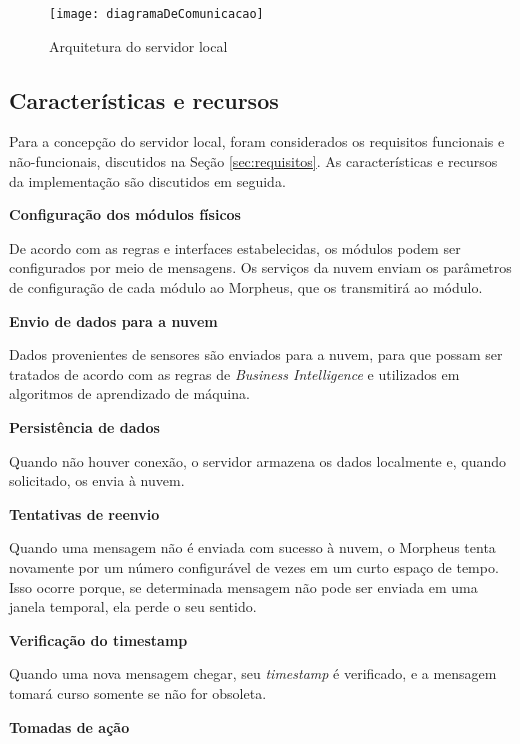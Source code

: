 \begin{figure}
	\centering
	\caption{Arquitetura do servidor local}
  \texttt{[image: diagramaDeComunicacao]}
\label{fig:diagramaDeComunicacao}
\end{figure}

\subsection{Características e recursos}
Para a concepção do servidor local, foram considerados os requisitos funcionais e não-funcionais, discutidos na Seção \ref{sec:requisitos}. As características e recursos da implementação são discutidos em seguida.

\begin{description}

\item \textbf{Configuração dos módulos físicos}

De acordo com as regras e interfaces estabelecidas, os módulos podem ser configurados por meio de mensagens. Os serviços da nuvem enviam os parâmetros de configuração de cada módulo ao Morpheus, que os transmitirá ao módulo.

\item \textbf{Envio de dados para a nuvem}

Dados provenientes de sensores são enviados para a nuvem, para que possam ser tratados de acordo com as regras de \emph{Business Intelligence} e utilizados em algoritmos de aprendizado de máquina.

\item \textbf{Persistência de dados}

Quando não houver conexão, o servidor armazena os dados localmente e, quando solicitado, os envia à nuvem.

\item \textbf{Tentativas de reenvio}

Quando uma mensagem não é enviada com sucesso à nuvem, o Morpheus tenta novamente por um número configurável de vezes em um curto espaço de tempo. Isso ocorre porque, se determinada mensagem não pode ser enviada em uma janela temporal, ela perde o seu sentido.

\item \textbf{Verificação do timestamp}

Quando uma nova mensagem chegar, seu \emph{timestamp} é verificado, e a mensagem tomará curso somente se não for obsoleta.

\item \textbf{Tomadas de ação}


\end{description}
